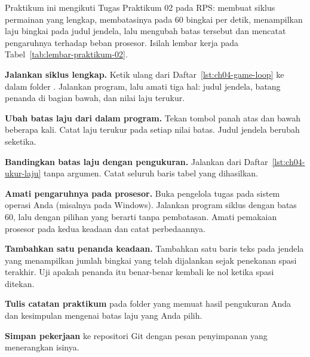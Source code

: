\begin{praktikumbox}
Praktikum ini mengikuti Tugas Praktikum 02 pada RPS: membuat siklus permainan
yang lengkap, membatasinya pada 60 bingkai per detik, menampilkan laju bingkai
pada judul jendela, lalu mengubah batas tersebut dan mencatat pengaruhnya
terhadap beban prosesor. Isilah lembar kerja pada
Tabel~\ref{tab:lembar-praktikum-02}.

\begin{langkah}
  \item \textbf{Jalankan siklus lengkap.} Ketik ulang
         dari Daftar~\ref{lst:ch04-game-loop} ke dalam
        folder . Jalankan program, lalu amati tiga hal: judul
        jendela, batang penanda di bagian bawah, dan nilai laju terukur.

  \item \textbf{Ubah batas laju dari dalam program.} Tekan tombol panah atas
        dan bawah beberapa kali. Catat laju terukur pada setiap nilai batas.
        Judul jendela berubah seketika.

  \item \textbf{Bandingkan batas laju dengan pengukuran.} Jalankan
         dari Daftar~\ref{lst:ch04-ukur-laju} tanpa
        argumen. Catat seluruh baris tabel yang dihasilkan.

  \item \textbf{Amati pengaruhnya pada prosesor.} Buka pengelola tugas pada
        sistem operasi Anda (misalnya  pada Windows).
        Jalankan program siklus dengan batas 60, lalu dengan pilihan
         yang berarti tanpa pembatasan. Amati pemakaian prosesor
        pada kedua keadaan dan catat perbedaannya.

  \item \textbf{Tambahkan satu penanda keadaan.} Tambahkan satu baris teks pada
        jendela yang menampilkan jumlah bingkai yang telah dijalankan sejak
        penekanan spasi terakhir. Uji apakah penanda itu benar-benar kembali ke
        nol ketika spasi ditekan.

  \item \textbf{Tulis catatan praktikum} pada folder  yang
        memuat hasil pengukuran Anda dan kesimpulan mengenai batas laju yang
        Anda pilih.

  \item \textbf{Simpan pekerjaan} ke repositori Git dengan pesan penyimpanan
        yang menerangkan isinya.
\end{langkah}
\end{praktikumbox}

